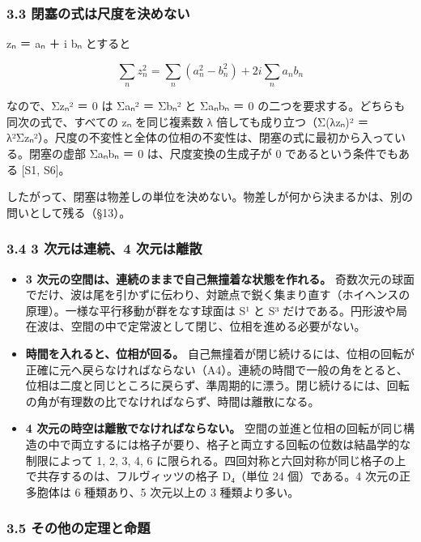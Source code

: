 \documentclass[
  a4paper,
]{ltjsarticle}
\providecommand{\tightlist}{%
  \setlength{\itemsep}{0pt}\setlength{\parskip}{0pt}}
\begin{document}
\subsubsection{3.3
閉塞の式は尺度を決めない}\label{ux9589ux585eux306eux5f0fux306fux5c3aux5ea6ux3092ux6c7aux3081ux306aux3044}

zₙ ＝ aₙ ＋ i bₙ とすると

\[
\sum_n z_n^2=\sum_n(a_n^2-b_n^2)+2i\sum_n a_nb_n
\]

なので、Σzₙ² ＝ 0 は Σaₙ² ＝ Σbₙ² と Σaₙbₙ ＝ 0
の二つを要求する。どちらも同次の式で、すべての zₙ を同じ複素数 λ
倍しても成り立つ（Σ(λzₙ)² ＝
λ²Σzₙ²）。尺度の不変性と全体の位相の不変性は、閉塞の式に最初から入っている。閉塞の虚部
Σaₙbₙ ＝ 0 は、尺度変換の生成子が 0 であるという条件でもある {[}S1,
S6{]}。

したがって、閉塞は物差しの単位を決めない。物差しが何から決まるかは、別の問いとして残る（§13）。

\subsubsection{3.4 3 次元は連続、4
次元は離散}\label{ux6b21ux5143ux306fux9023ux7d9a4-ux6b21ux5143ux306fux96e2ux6563}

\begin{itemize}
\tightlist
\item
  \textbf{3 次元の空間は、連続のままで自己無撞着な状態を作れる。}
  奇数次元の球面でだけ、波は尾を引かずに伝わり、対蹠点で鋭く集まり直す（ホイヘンスの原理）。一様な平行移動が群をなす球面は
  S¹ と S³
  だけである。円形波や局在波は、空間の中で定常波として閉じ、位相を進める必要がない。
\item
  \textbf{時間を入れると、位相が回る。}
  自己無撞着が閉じ続けるには、位相の回転が正確に元へ戻らなければならない（A4）。連続の時間で一般の角をとると、位相は二度と同じところに戻らず、準周期的に漂う。閉じ続けるには、回転の角が有理数の比でなければならず、時間は離散になる。
\item
  \textbf{4 次元の時空は離散でなければならない。}
  空間の並進と位相の回転が同じ構造の中で両立するには格子が要り、格子と両立する回転の位数は結晶学的な制限によって
  1, 2, 3, 4, 6
  に限られる。四回対称と六回対称が同じ格子の上で共存するのは、フルヴィッツの格子
  D₄（単位 24 個）である。4 次元の正多胞体は 6 種類あり、5 次元以上の 3
  種類より多い。
\end{itemize}

\subsubsection{3.5
その他の定理と命題}\label{ux305dux306eux4ed6ux306eux5b9aux7406ux3068ux547dux984c}
\end{document}
